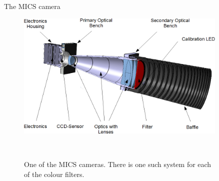 \documentclass[final,hyperref={pdfpagelabels=false}]{beamer}
\begin{document}
\begin{frame}[t]
\begin{columns}[t]
\begin{column}{.23\textwidth}
\begin{block}{The MICS camera}
\begin{figure}
\includegraphics[scale=0.76]{fig/MICS_open_eng.png}
\caption{One of the MICS cameras. There is one such system for each of the colour filters.}~\label{fig:MICS}
\end{figure}
\end{block}

\end{column}




\begin{column}{.01\textwidth}\end{column} %
 
\begin{column}{.23\textwidth} %




\end{column}
\end{columns}
\end{frame}
\end{document}

